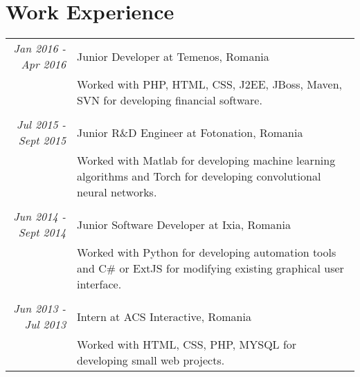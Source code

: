 \documentclass[a4paper,10pt]{article} %
\begin{document}

\section{Work Experience}
\begin{tabular}{r|p{11cm}}

\emph{Jan 2016 - Apr 2016} & Junior Developer at Temenos, Romania \\
& \footnotesize{Worked with PHP, HTML, CSS, J2EE, JBoss, Maven, SVN for developing financial software.}\\
\multicolumn{2}{c}{} \\


\emph{Jul 2015 - Sept 2015} & Junior R\&D Engineer at Fotonation, Romania \\
& \footnotesize{Worked with Matlab for developing machine learning algorithms and Torch for developing convolutional neural networks.}\\
\multicolumn{2}{c}{} \\


\emph{Jun 2014 - Sept 2014} & Junior Software Developer at Ixia, Romania\\
& \footnotesize{Worked with Python for developing automation tools and C\# or ExtJS for modifying existing graphical user interface.}\\
\multicolumn{2}{c}{} \\


\emph{Jun 2013 - Jul 2013} & Intern at ACS Interactive, Romania\\
& \footnotesize{Worked with HTML, CSS, PHP, MYSQL for developing small web projects.}
\end{tabular}


\end{document}
